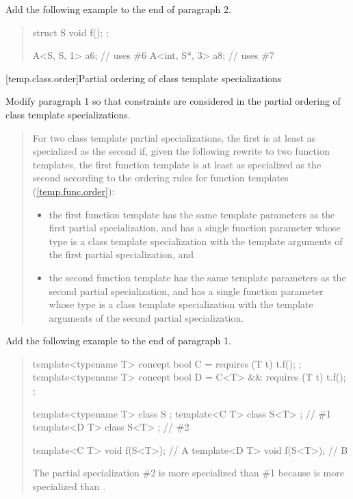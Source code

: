 Add the following example to the end of paragraph 2.

\begin{quote}
\begin{addedblock}
\enterexample
\begin{codeblock}
struct S { void f(); };

A<S, S, 1>    a6; // uses \#6
A<int, S*, 3> a8; // uses \#7
\end{codeblock}
\exitexample
\end{addedblock}
\end{quote}


[temp.class.order]{Partial ordering of class template specializations}

Modify paragraph 1 so that constraints are considered in the
partial ordering of class template specializations. 

\begin{quote}
\pnum
For two class template partial specializations, the first is 
at least as specialized as the second if, given the following 
rewrite to two function templates, the first function template 
is at least as specialized as the second according to the ordering 
rules for function templates 
(\ref{temp.func.order}):
% 
\begin{itemize}
\item the first function template has the same template 
parameters  
as the first partial specialization, and has a single function parameter 
whose type is a class template specialization with the template
arguments of the first partial specialization, and

\item the second function template has the same template 
parameters  
as the second partial specialization, and has a single function parameter 
whose type is a class template specialization with the template
arguments of the second partial specialization.
\end{itemize}
\end{quote}

Add the following example to the end of paragraph 1.

\begin{quote}
\begin{addedblock}
\enterexample
\begin{codeblock}
template<typename T> concept bool C = requires (T t) { t.f(); };
template<typename T> concept bool D = C<T> && requires (T t) { t.f(); };


template<typename T> class S { };
template<C T> class S<T> { }; // \#1
template<D T> class S<T> { }; // \#2

template<C T> void f(S<T>); // A
template<D T> void f(S<T>); // B
\end{codeblock}
The partial specialization \#2 is more specialized than 
\#1 because  is more specialized than .
\exitexample
\end{addedblock}
\end{quote}


